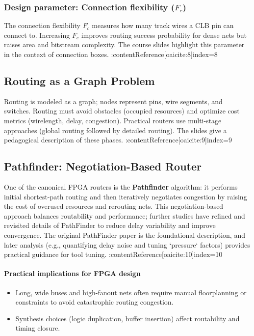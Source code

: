 \documentclass[11pt]{article}
\begin{document}
\subsubsection*{Design parameter: Connection flexibility ($F_c$)}
The connection flexibility $F_c$ measures how many track wires a CLB pin can connect to. Increasing $F_c$ improves routing success probability for dense nets but raises area and bitstream complexity. The course slides highlight this parameter in the context of connection boxes. :contentReference[oaicite:8]{index=8}

\subsection{Routing as a Graph Problem}
Routing is modeled as a graph; nodes represent pins, wire segments, and switches. Routing must avoid obstacles (occupied resources) and optimize cost metrics (wirelength, delay, congestion). Practical routers use multi-stage approaches (global routing followed by detailed routing). The slides give a pedagogical description of these phases. :contentReference[oaicite:9]{index=9}

\subsection{Pathfinder: Negotiation-Based Router}
One of the canonical FPGA routers is the \textbf{Pathfinder} algorithm: it performs initial shortest-path routing and then iteratively negotiates congestion by raising the cost of overused resources and rerouting nets. This negotiation-based approach balances routability and performance; further studies have refined and revisited details of PathFinder to reduce delay variability and improve convergence. The original PathFinder paper is the foundational description, and later analysis (e.g., quantifying delay noise and tuning `pressure` factors) provides practical guidance for tool tuning. :contentReference[oaicite:10]{index=10}

\paragraph{Practical implications for FPGA design}
\begin{itemize}
  \item Long, wide buses and high-fanout nets often require manual floorplanning or constraints to avoid catastrophic routing congestion.
  \item Synthesis choices (logic duplication, buffer insertion) affect routability and timing closure.
\end{itemize}
\end{document}
